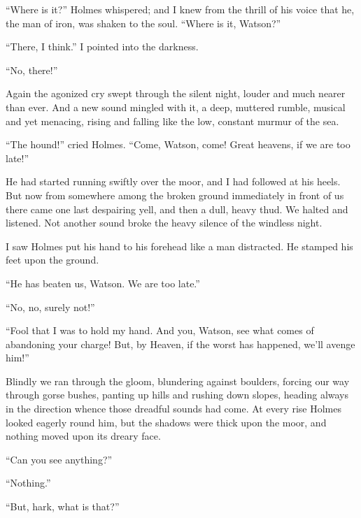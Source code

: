 \documentclass[paper=5.5in:8.5in,BCOR=7mm,twoside,DIV=calc,12pt,usegeometry,openany,chapterprefix,endperiod,headings=big]{scrbook} %
\begin{document}
\enquote{Where is it?} Holmes whispered; and I knew from the thrill of his voice that he, the man of iron, was shaken to the soul. \enquote{Where is it, Watson?}

\enquote{There, I think.} I pointed into the darkness.

\enquote{No, there!}

Again the agonized cry swept through the silent night, louder and much nearer than ever. And a new sound mingled with it, a deep, muttered rumble, musical and yet menacing, rising and falling like the low, constant murmur of the sea.

\enquote{The hound!} cried Holmes. \enquote{Come, Watson, come! Great heavens, if we are too late!}

He had started running swiftly over the moor, and I had followed at his heels. But now from somewhere among the broken ground immediately in front of us there came one last despairing yell, and then a dull, heavy thud. We halted and listened. Not another sound broke the heavy silence of the windless night.

I saw Holmes put his hand to his forehead like a man distracted. He stamped his feet upon the ground.

\enquote{He has beaten us, Watson. We are too late.}

\enquote{No, no, surely not!}

\enquote{Fool that I was to hold my hand. And you, Watson, see what comes of abandoning your charge! But, by Heaven, if the worst has happened, we'll avenge him!}

Blindly we ran through the gloom, blundering against boulders, forcing our way through gorse bushes, panting up hills and rushing down slopes, heading always in the direction whence those dreadful sounds had come. At every rise Holmes looked eagerly round him, but the shadows were thick upon the moor, and nothing moved upon its dreary face.

\enquote{Can you see anything?}

\enquote{Nothing.}

\enquote{But, hark, what is that?}

\end{document}
